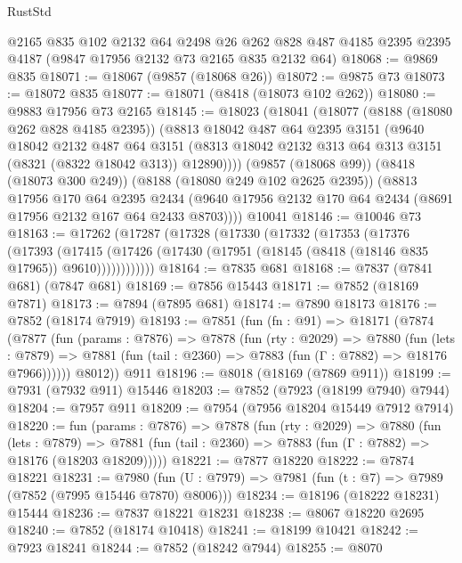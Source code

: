 \begin{lexlean}{RustStd}
\begin{coremodule}
    @2165
    @835
    @102
    @2132
    @64
    @2498
    @26
    @262
    @828
    @487
    @4185
    @2395
    @2395
    @4187
    (@9847 @17956 @2132 @73 @2165 @835 @2132 @64)
@18068 := @9869 @835
@18071 := @18067 (@9857 (@18068 @26))
@18072 := @9875 @73
@18073 := @18072 @835
@18077 := @18071 (@8418 (@18073 @102 @262))
@18080 := @9883 @17956 @73 @2165
@18145 := @18023
    (@18041
      (@18077
        (@8188 (@18080 @262 @828 @4185 @2395))
        (@8813
          @18042
          @487
          @64
          @2395
          @3151
          (@9640
            @18042
            @2132
            @487
            @64
            @3151
            (@8313 @18042 @2132 @313 @64 @313 @3151 (@8321 (@8322 @18042 @313)) @12890))))
      (@9857 (@18068 @99))
      (@8418 (@18073 @300 @249))
      (@8188 (@18080 @249 @102 @2625 @2395))
      (@8813
        @17956
        @170
        @64
        @2395
        @2434
        (@9640 @17956 @2132 @170 @64 @2434 (@8691 @17956 @2132 @167 @64 @2433 @8703))))
    @10041
@18146 := @10046 @73
@18163 := @17262
    (@17287
      (@17328
        (@17330
          (@17332
            (@17353
              (@17376
                (@17393
                  (@17415
                    (@17426 (@17430 (@17951 (@18145 (@8418 (@18146 @835 @17965)) @9610))))))))))))
@18164 := @7835 @681
@18168 := @7837 (@7841 @681) (@7847 @681)
@18169 := @7856 @15443
@18171 := @7852 (@18169 @7871)
@18173 := @7894 (@7895 @681)
@18174 := @7890 @18173
@18176 := @7852 (@18174 @7919)
@18193 := @7851
    (fun (fn : @91) =>
    @18171
      (@7874
        (@7877
          (fun (params : @7876) =>
          @7878
            (fun (rty : @2029) =>
            @7880
              (fun (lets : @7879) =>
              @7881 (fun (tail : @2360) => @7883 (fun (Γ : @7882) => @18176 @7966))))))
        @8012))
    @911
@18196 := @8018 (@18169 (@7869 @911))
@18199 := @7931 (@7932 @911) @15446
@18203 := @7852 (@7923 (@18199 @7940) @7944)
@18204 := @7957 @911
@18209 := @7954 (@7956 @18204 @15449 @7912 @7914)
@18220 := fun (params : @7876) =>
  @7878
    (fun (rty : @2029) =>
    @7880
      (fun (lets : @7879) =>
      @7881 (fun (tail : @2360) => @7883 (fun (Γ : @7882) => @18176 (@18203 @18209)))))
@18221 := @7877 @18220
@18222 := @7874 @18221
@18231 := @7980
    (fun (U : @7979) => @7981 (fun (t : @7) => @7989 (@7852 (@7995 @15446 @7870) @8006)))
@18234 := @18196 (@18222 @18231) @15444
@18236 := @7837 @18221 @18231
@18238 := @8067 @18220 @2695
@18240 := @7852 (@18174 @10418)
@18241 := @18199 @10421
@18242 := @7923 @18241
@18244 := @7852 (@18242 @7944)
@18255 := @8070

\end{coremodule}
\end{lexlean}
